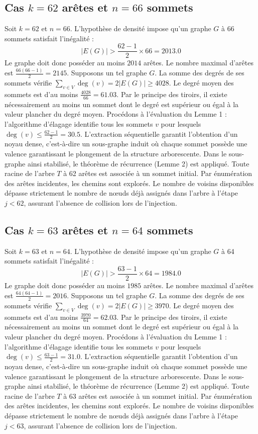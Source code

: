 \documentclass[12pt,a4paper]{article}
\begin{document}
\subsection{Cas $k = 62$ arêtes et $n = 66$ sommets}
Soit $k = 62$ et $n = 66$. L'hypothèse de densité impose qu'un graphe $G$ à 66 sommets satisfait l'inégalité :
$$ |E(G)| > \frac{62-1}{2} \times 66 = 2013.0 $$
Le graphe doit donc posséder au moins $2014$ arêtes. Le nombre maximal d'arêtes est $\frac{66(66-1)}{2} = 2145$.
Supposons un tel graphe $G$. La somme des degrés de ses sommets vérifie $\sum_{v \in V} \deg(v) = 2|E(G)| \geq 4028$.
Le degré moyen des sommets est d'au moins $\frac{4028}{66} = 61.03$.
Par le principe des tiroirs, il existe nécessairement au moins un sommet dont le degré est supérieur ou égal à la valeur plancher du degré moyen.
Procédons à l'évaluation du Lemme 1 : l'algorithme d'élagage identifie tous les sommets $v$ pour lesquels $\deg(v) \leq \frac{62-1}{2} = 30.5$.
L'extraction séquentielle garantit l'obtention d'un noyau dense, c'est-à-dire un sous-graphe induit où chaque sommet possède une valence garantissant le plongement de la structure arborescente.
Dans le sous-graphe ainsi stabilisé, le théorème de récurrence (Lemme 2) est appliqué. Toute racine de l'arbre $T$ à 62 arêtes est associée à un sommet initial. Par énumération des arêtes incidentes, les chemins sont explorés. Le nombre de voisins disponibles dépasse strictement le nombre de nœuds déjà assignés dans l'arbre à l'étape $j < 62$, assurant l'absence de collision lors de l'injection.

\subsection{Cas $k = 63$ arêtes et $n = 64$ sommets}
Soit $k = 63$ et $n = 64$. L'hypothèse de densité impose qu'un graphe $G$ à 64 sommets satisfait l'inégalité :
$$ |E(G)| > \frac{63-1}{2} \times 64 = 1984.0 $$
Le graphe doit donc posséder au moins $1985$ arêtes. Le nombre maximal d'arêtes est $\frac{64(64-1)}{2} = 2016$.
Supposons un tel graphe $G$. La somme des degrés de ses sommets vérifie $\sum_{v \in V} \deg(v) = 2|E(G)| \geq 3970$.
Le degré moyen des sommets est d'au moins $\frac{3970}{64} = 62.03$.
Par le principe des tiroirs, il existe nécessairement au moins un sommet dont le degré est supérieur ou égal à la valeur plancher du degré moyen.
Procédons à l'évaluation du Lemme 1 : l'algorithme d'élagage identifie tous les sommets $v$ pour lesquels $\deg(v) \leq \frac{63-1}{2} = 31.0$.
L'extraction séquentielle garantit l'obtention d'un noyau dense, c'est-à-dire un sous-graphe induit où chaque sommet possède une valence garantissant le plongement de la structure arborescente.
Dans le sous-graphe ainsi stabilisé, le théorème de récurrence (Lemme 2) est appliqué. Toute racine de l'arbre $T$ à 63 arêtes est associée à un sommet initial. Par énumération des arêtes incidentes, les chemins sont explorés. Le nombre de voisins disponibles dépasse strictement le nombre de nœuds déjà assignés dans l'arbre à l'étape $j < 63$, assurant l'absence de collision lors de l'injection.
\end{document}
